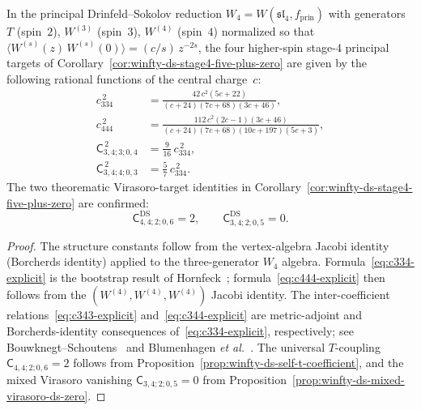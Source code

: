 \begin{proposition}
\label{prop:w4-ds-ope-explicit}
In the principal Drinfeld--Sokolov reduction
$W_4 = W(\mathfrak{sl}_4, f_{\mathrm{prin}})$ with generators
$T$ (spin~$2$), $W^{(3)}$ (spin~$3$), $W^{(4)}$ (spin~$4$)
normalized so that
$\langle W^{(s)}(z)\,W^{(s)}(0)\rangle = (c/s)\,z^{-2s}$,
the four higher-spin stage-$4$ principal targets of
Corollary~\textup{\ref{cor:winfty-ds-stage4-five-plus-zero}} are
given by the following rational functions of the central charge~$c$:
\begin{align}
c_{334}^{\,2}
&= \frac{42\,c^2(5c+22)}{(c+24)(7c+68)(3c+46)},
\label{eq:c334-explicit}
\\[4pt]
c_{444}^{\,2}
&= \frac{112\,c^2(2c-1)(3c+46)}{(c+24)(7c+68)(10c+197)(5c+3)},
\label{eq:c444-explicit}
\\[4pt]
\mathsf{C}_{3,4;3;0,4}^{\,2}
&= \tfrac{9}{16}\,c_{334}^{\,2},
\label{eq:c343-explicit}
\\[4pt]
\mathsf{C}_{3,4;4;0,3}^{\,2}
&= \tfrac{5}{7}\,c_{334}^{\,2}.
\label{eq:c344-explicit}
\end{align}
The two theorematic Virasoro-target identities in
Corollary~\textup{\ref{cor:winfty-ds-stage4-five-plus-zero}} are
confirmed:
\begin{equation}
\mathsf{C}^{\mathrm{DS}}_{4,4;2;0,6} = 2,
\qquad
\mathsf{C}^{\mathrm{DS}}_{3,4;2;0,5} = 0.
\label{eq:w4-virasoro-target-identities-verified}
\end{equation}
\end{proposition}

\begin{proof}
The structure constants follow from the vertex-algebra Jacobi
identity (Borcherds identity) applied to the three-generator $W_4$
algebra.  Formula~\eqref{eq:c334-explicit} is the bootstrap result
of Hornfeck~\cite{Hornfeck93}; formula~\eqref{eq:c444-explicit}
then follows from the $(W^{(4)}, W^{(4)}, W^{(4)})$ Jacobi identity.
The inter-coefficient relations~\eqref{eq:c343-explicit}
and~\eqref{eq:c344-explicit} are metric-adjoint and Borcherds-identity
consequences of~\eqref{eq:c334-explicit}, respectively; see
Bouwknegt--Schoutens~\cite{Bouwknegt-Schoutens}
and Blumenhagen \textit{et al.}~\cite{BEHFH96}.
The universal $T$-coupling
$\mathsf{C}_{4,4;2;0,6}=2$ follows from
Proposition~\ref{prop:winfty-ds-self-t-coefficient}, and the mixed
Virasoro vanishing
$\mathsf{C}_{3,4;2;0,5}=0$ from
Proposition~\ref{prop:winfty-ds-mixed-virasoro-ds-zero}.
\end{proof}

